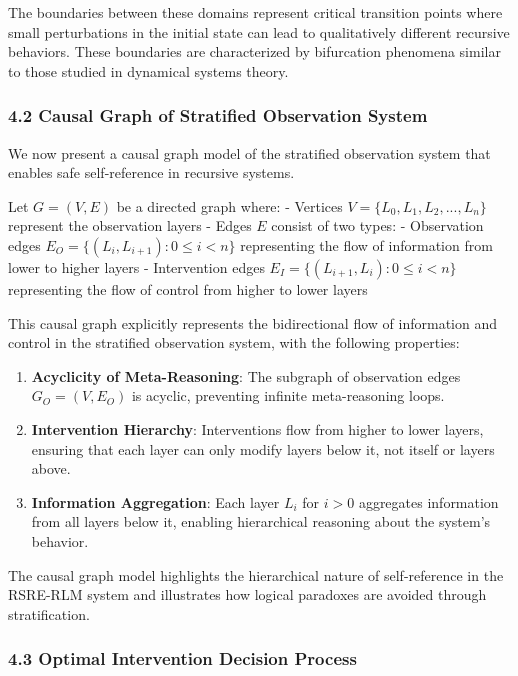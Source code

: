 \documentclass[
]{article}
\begin{document}
The boundaries between these domains represent critical transition
points where small perturbations in the initial state can lead to
qualitatively different recursive behaviors. These boundaries are
characterized by bifurcation phenomena similar to those studied in
dynamical systems theory.

\subsubsection{4.2 Causal Graph of Stratified Observation
System}\label{causal-graph-of-stratified-observation-system}

We now present a causal graph model of the stratified observation system
that enables safe self-reference in recursive systems.

Let \(G = (V, E)\) be a directed graph where: - Vertices
\(V = \{L_0, L_1, L_2, ..., L_n\}\) represent the observation layers -
Edges \(E\) consist of two types: - Observation edges
\(E_O = \{(L_i, L_{i+1}) : 0 \leq i < n\}\) representing the flow of
information from lower to higher layers - Intervention edges
\(E_I = \{(L_{i+1}, L_i) : 0 \leq i < n\}\) representing the flow of
control from higher to lower layers

This causal graph explicitly represents the bidirectional flow of
information and control in the stratified observation system, with the
following properties:

\begin{enumerate}
\def\labelenumi{\arabic{enumi}.}
\item
  \textbf{Acyclicity of Meta-Reasoning}: The subgraph of observation
  edges \(G_O = (V, E_O)\) is acyclic, preventing infinite
  meta-reasoning loops.
\item
  \textbf{Intervention Hierarchy}: Interventions flow from higher to
  lower layers, ensuring that each layer can only modify layers below
  it, not itself or layers above.
\item
  \textbf{Information Aggregation}: Each layer \(L_i\) for \(i > 0\)
  aggregates information from all layers below it, enabling hierarchical
  reasoning about the system's behavior.
\end{enumerate}

The causal graph model highlights the hierarchical nature of
self-reference in the RSRE-RLM system and illustrates how logical
paradoxes are avoided through stratification.

\subsubsection{4.3 Optimal Intervention Decision
Process}\label{optimal-intervention-decision-process}
\end{document}
